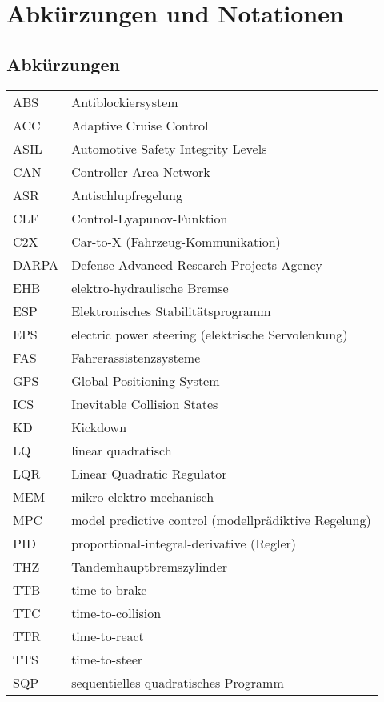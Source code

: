 
\chapter*{Abkürzungen und Notationen}
\markboth{}{}%

\renewcommand{\arraystretch}{1.18}
\setlength{\tabcolsep}{0cm}

\section*{Abk\"{u}rzungen}
\vspace{-4mm}
\begin{longtable}{p{26mm}p{89mm}}
ABS & Antiblockiersystem \\
ACC & Adaptive Cruise Control \\
ASIL & Automotive Safety Integrity Levels \\
CAN & Controller Area Network \\
ASR & Antischlupfregelung \\
CLF & Control-Lyapunov-Funktion \\
C2X & Car-to-X (Fahrzeug-Kommunikation) \\
DARPA & Defense Advanced Research Projects Agency \\
EHB & elektro-hydraulische Bremse \\
ESP & Elektronisches Stabilitätsprogramm \\
EPS & electric power steering (elektrische Servolenkung) \\
FAS	& Fahrerassistenzsysteme \\
GPS & Global Positioning System \\
ICS & Inevitable Collision States \\
KD  & Kickdown \\
LQ  & linear quadratisch \\
LQR & Linear Quadratic Regulator \\
MEM & mikro-elektro-mechanisch \\
MPC & model predictive control (modellprädiktive Regelung) \\
PID & proportional-integral-derivative (Regler) \\
THZ & Tandemhauptbremszylinder \\
TTB & time-to-brake \\
TTC & time-to-collision \\
TTR & time-to-react\\
TTS & time-to-steer \\
SQP & sequentielles quadratisches Programm \\
\end{longtable}

